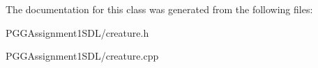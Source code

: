 The documentation for this class was generated from the following files\+:\begin{DoxyCompactItemize}
\item 
P\+G\+G\+Assignment1\+S\+D\+L/creature.\+h\item 
P\+G\+G\+Assignment1\+S\+D\+L/creature.\+cpp\end{DoxyCompactItemize}
